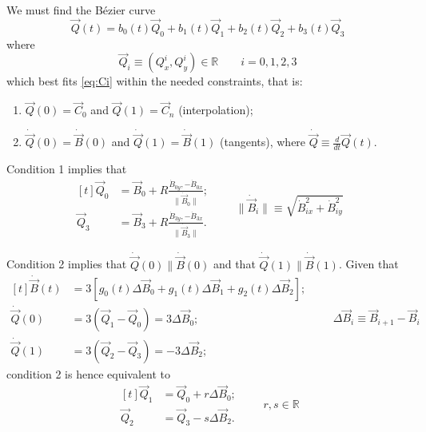 \documentclass{scrartcl}
\newcommand\V[1]{\vec{#1}}
\newcommand\D[1]{\dot{#1}}
\newcommand\DV[1]{\D{\V{#1}}}
\begin{document}
We must find the Bézier curve
\begin{equation}\label{eq:q}
\V{Q}(t) = b_0(t) \V{Q}_0 + b_1(t) \V{Q}_1 + b_2(t) \V{Q}_2 + b_3(t) \V{Q}_3
\end{equation}
where
\begin{equation*}
\V{Q}_i \equiv ( Q^i_x, Q^i_y ) \in \mathbb{R} \qquad i = 0,1,2,3
\end{equation*}
which best fits \eqref{eq:Ci} within the needed constraints, that is:
\begin{enumerate}
\item $\V{Q}(0) = \V{C}_0$ and $\V{Q}(1) = \V{C}_n$ (interpolation);
\item $\DV{Q}(0) = \DV{B}(0)$ and $\DV{Q}(1) = \DV{B}(1)$ (tangents),
where $\DV{Q} \equiv \frac{d}{dt} \V{Q}(t)$.
\end{enumerate}

\medskip
Condition 1 implies that
\begin{equation}\label{eq:q03}
\begin{aligned}[t]
    \V{Q}_0 &= \V{B}_0 + R \frac{\D{B}_{0y}, -\D{B}_{0x}}
	{\| \DV{B}_0 \|};\\
    \V{Q}_3 &= \V{B}_3 + R \frac{\D{B}_{3y}, -\D{B}_{3x}}
	{\| \DV{B}_3 \|}.
\end{aligned}
\qquad\| \DV{B}_i \| \equiv \sqrt{\D{B}_{ix}^2 + \D{B}_{iy}^2}
\end{equation}

Condition 2 implies that $\DV{Q}(0) \parallel \DV{B}(0)$ and that
$\DV{Q}(1) \parallel \DV{B}(1)$.
Given that
\begin{equation}
\begin{aligned}[t]
    \DV{B}(t) &= 3 \left[
	g_0(t) \Delta \V{B}_0 +
	g_1(t) \Delta \V{B}_1 +
	g_2(t) \Delta \V{B}_2
    \right]; \\
    \DV{Q}(0) &= 3 ( \V{Q}_1 - \V{Q}_0 ) = 3 \Delta{\V{B}_0}; \\
    \DV{Q}(1) &= 3 ( \V{Q}_2 - \V{Q}_3 ) = -3 \Delta{\V{B}_2};
\end{aligned}
\qquad\Delta \V{B}_i \equiv \V{B}_{i+1} - \V{B}_i
\end{equation}
condition 2 is hence equivalent to
\begin{equation}\label{eq:q12}
\begin{aligned}[t]
    \V{Q}_1 &= \V{Q}_0 + r \Delta \V{B}_0; \\
    \V{Q}_2 &= \V{Q}_3 - s \Delta \V{B}_2.
\end{aligned}
\qquad r, s \in \mathbb{R}
\end{equation}
\end{document}
